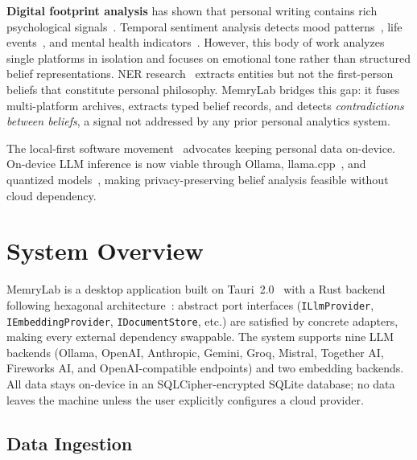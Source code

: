 \documentclass[conference]{IEEEtran}
\begin{document}
\textbf{Digital footprint analysis} has shown that personal writing contains rich psychological signals~\cite{kosinski2013private,youyou2015computer}. Temporal sentiment analysis detects mood patterns~\cite{thelwall2012sentiment,golder2011diurnal}, life events~\cite{li2014major}, and mental health indicators~\cite{de2013social}. However, this body of work analyzes single platforms in isolation and focuses on emotional tone rather than structured belief representations. NER research~\cite{li2020survey,yadav2018ner} extracts entities but not the first-person beliefs that constitute personal philosophy. MemryLab bridges this gap: it fuses multi-platform archives, extracts typed belief records, and detects \emph{contradictions between beliefs}, a signal not addressed by any prior personal analytics system.

The local-first software movement~\cite{kleppmann2019localfirst} advocates keeping personal data on-device. On-device LLM inference is now viable through Ollama, llama.cpp~\cite{gerganov2023llamacpp}, and quantized models~\cite{dettmers2023qlora}, making privacy-preserving belief analysis feasible without cloud dependency.

\section{System Overview}
\label{sec:architecture}

MemryLab is a desktop application built on Tauri~2.0~\cite{thompson2024tauri} with a Rust backend following hexagonal architecture~\cite{cockburn2005hexagonal}: abstract port interfaces (\texttt{ILlmProvider}, \texttt{IEmbeddingProvider}, \texttt{IDocumentStore}, etc.) are satisfied by concrete adapters, making every external dependency swappable. The system supports nine LLM backends (Ollama, OpenAI, Anthropic, Gemini, Groq, Mistral, Together AI, Fireworks AI, and OpenAI-compatible endpoints) and two embedding backends. All data stays on-device in an SQLCipher-encrypted SQLite database; no data leaves the machine unless the user explicitly configures a cloud provider.

\subsection{Data Ingestion}
\end{document}
